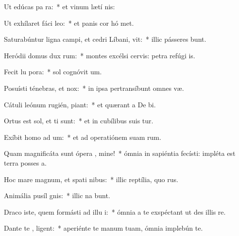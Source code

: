 \item Ut edúcas pa  ra:~* et vinum lætí  nis:
\item Ut exhílaret fáci  leo:~* et panis cor hó met.
\item Saturabúntur ligna campi, et cedri Líbani,  vit:~* illic pásseres bunt.
\item Heródii domus dux  rum:~* montes excélsi cervis: petra refúgi is.
\item Fecit lu  pora:~* sol cognóvit  um.
\item Posuísti ténebras, et   nox:~* in ipsa pertransíbunt omnes  væ.
\item Cátuli leónum rugién,  piant:~* et quærant a De  bi.
\item Ortus est sol, et ti sunt:~* et in cubílibus suis tur.
\item Exíbit homo ad  um:~* et ad operatiónem suam   rum.
\item Quam magnificáta sunt ópera , mine!~* ómnia in sapiéntia fecísti: impléta est terra posses a.
\item Hoc mare magnum, et spati nibus:~* illic reptília, quo   rus.
\item Animália pusíl  gnis:~* illic na bunt.
\item Draco iste, quem formásti ad illu i:~* ómnia a te exspéctant ut des illis   re.
\item Dante te , ligent:~* aperiénte te manum tuam, ómnia implebún te.
